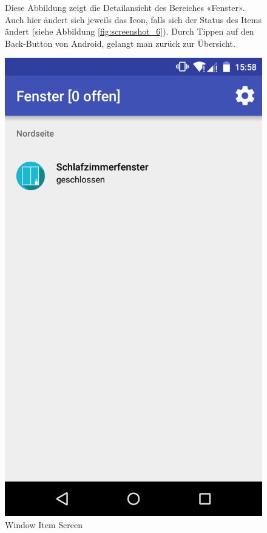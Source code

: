 \begin{figure}[htbp]
	\begin{minipage}{0.6\textwidth} 
Diese Abbildung zeigt die Detailansicht des Bereiches «Fenster». Auch hier ändert sich jeweils das Icon, falls sich der Status des Items ändert (siehe Abbildung \ref{fig:screenshot_6}). Durch Tippen auf den Back-Button von Android, gelangt man zurück zur Übersicht.
	\end{minipage}
	\hfill
	\begin{minipage}{0.32\textwidth}
		\includegraphics[scale=0.12]{appendix/img/AppScreenshots/Screenshot3}
		\caption{Window Item Screen}
		\label{fig:screenshot_3}
	\end{minipage}
\end{figure}

